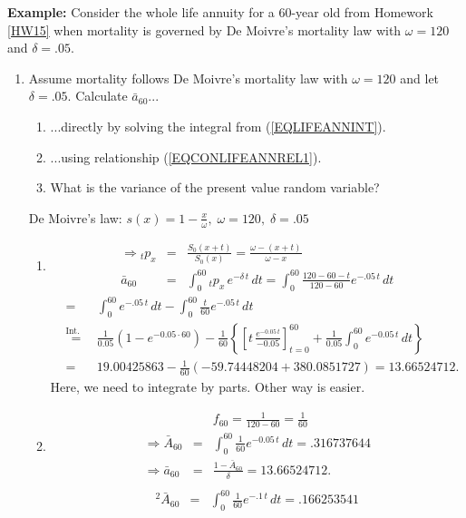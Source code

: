 \documentclass[11pt,fleqn,oneside]{book}
\begin{document}
\noindent \textbf{Example:}
Consider the whole life annuity for a 60-year old from Homework \ref{HW15} when mortality is governed by De Moivre's mortality law with $\omega = 120$ and $\delta=.05$. 
\begin{enumerate}
\item Assume mortality follows De Moivre's mortality law with $\omega = 120$ and let $\delta=.05$. Calculate $\bar{a}_{60}$...
\begin{enumerate}
\item ...directly by solving the integral from (\ref{EQLIFEANNINT}).
\item ...using relationship (\ref{EQCONLIFEANNREL1}).
\item What is the variance of the present value random variable?
\end{enumerate}
De Moivre's law: $s(x) = 1 - \frac{x}{\omega},\; \omega = 120,\;\delta = .05$
\begin{enumerate}
\item 
\begin{eqnarray*}
\Rightarrow {_tp_x} &=& \frac{S_0(x+t)}{S_0(x)} = \frac{\omega - (x+t)}{\omega - x}\\
{\bar{a}_{60}} &=& \int_0^{60} {_tp_x}\, e^{-\delta\,t}\,dt = \int_0^{60} \frac{120-60-t}{120-60} e^{-.05\,t}\,dt 
\end{eqnarray*}
\begin{eqnarray*}
&=& \int_0^{60}  e^{-.05\,t}\,dt - \int_0^{60} \frac{t}{60} e^{-.05\,t}\,dt\\
&\stackrel{\text{Int.\ by Parts}}{=} & 
\frac{1}{0.05}\left(1 - e^{-0.05\cdot 60}\right) - \frac{1}{60} \left\{\left[t\,\frac{e^{-0.05\,t}}{-0.05}\right]_{t=0}^{60} + \frac{1}{0.05} \int_0^{60} e^{-0.05\,t}\,dt\right\}\\
&=& 19.00425863 - \frac{1}{60}\left(-59.74448204 + 380.0851727\right) = 13.66524712.
\end{eqnarray*}
Here, we need to integrate by parts. Other way is easier.
\item
\begin{eqnarray*}
&& f_{60} = \frac{1}{120 - 60} = \frac{1}{60}\\
\Rightarrow {\bar{A}_{60}} &=& \int_0^{60} \frac{1}{60} e^{-0.05\,t}\,dt = .316737644\\
\Rightarrow {\bar{a}_{60}} &=& \frac{1 - {\bar{A}_{60}}}{\delta} = 13.66524712.\\
\end{eqnarray*}
\begin{eqnarray*}
{^2\bar{A}_{60}} &=& \int_0^{60} \frac{1}{60} e^{-.1\,t}\,dt = .166253541\\

\end{eqnarray*}
\end{enumerate}
\end{enumerate}
\end{document}
